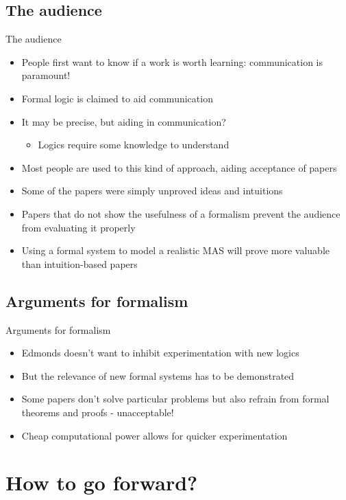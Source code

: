 \documentclass[10pt,a4paper]{beamer}
\begin{document}
\subsection{The audience}

\begin{frame}{The audience}
\begin{itemize}
\item People first want to know if a work is worth learning: communication is paramount!
\item Formal logic is claimed to aid communication
\item It may be precise, but aiding in communication?
\begin{itemize}
\item Logics require some knowledge to understand
\end{itemize}
\item Most people are used to this kind of approach, aiding acceptance of papers
\item Some of the papers were simply unproved ideas and intuitions
\item Papers that do not show the usefulness of a formalism prevent the audience from evaluating it properly
\item Using a formal system to model a realistic MAS will prove more valuable than intuition-based papers
\end{itemize}
\end{frame}

\subsection{Arguments for formalism}

\begin{frame}{Arguments for formalism}
\begin{itemize}
\item Edmonds doesn't want to inhibit experimentation with new logics
\item But the relevance of new formal systems has to be demonstrated
\item Some papers don't solve particular problems but also refrain from formal theorems and proofs - unacceptable!
\item Cheap computational power allows for quicker experimentation
\end{itemize}
\end{frame}

\section{How to go forward?}
\end{document}

